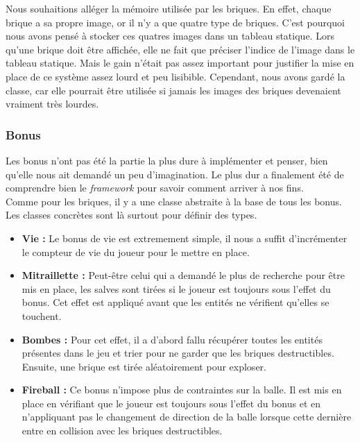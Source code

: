 \documentclass[a4paper,10pt]{article}
\begin{document}
        Nous souhaitions alléger la mémoire utilisée par les briques. En effet, chaque brique a sa propre image, or
        il n'y a que quatre type de briques. C'est pourquoi nous avons pensé à stocker ces quatres images dans un
        tableau statique. Lors qu'une brique doit être affichée, elle ne fait que préciser l'indice de l'image
        dans le tableau statique. Mais le gain n'était pas assez important pour justifier la mise en place de
        ce système assez lourd et peu lisibible. Cependant, nous avons gardé la classe, car elle pourrait être
        utilisée si jamais les images des briques devenaient vraiment très lourdes.

    \subsubsection{Bonus}
        Les bonus n'ont pas été la partie la plus dure à implémenter et penser, bien qu'elle nous ait demandé un peu
        d'imagination. Le plus dur a finalement été de comprendre bien le \textit{framework} pour savoir
        comment arriver à nos fins. \\

        Comme pour les briques, il y a une classe abstraite à la base de tous les bonus. Les classes concrètes
        sont là surtout pour définir des types.

        \begin{itemize}
            \item \textbf{Vie :}
                Le bonus de vie est extremement simple, il nous a suffit d'incrémenter le compteur de vie du joueur
                pour le mettre en place.

            \item \textbf{Mitraillette :}
                Peut-être celui qui a demandé le plus de recherche pour être mis en place, les salves sont tirées
                si le joueur est toujours sous l'effet du bonus. Cet effet est appliqué avant que les entités
                ne vérifient qu'elles se touchent.

            \item \textbf{Bombes :}
                Pour cet effet, il a d'abord fallu récupérer toutes les entités présentes dans le jeu et trier
                pour ne garder que les briques destructibles. Ensuite, une brique est tirée aléatoirement pour exploser.

            \item \textbf{Fireball :}
                Ce bonus n'impose plus de contraintes sur la balle. Il est mis en place en vérifiant que le joueur
                est toujours sous l'effet du bonus et en n'appliquant pas le changement de direction de la balle lorsque
                cette dernière entre en collision avec les briques destructibles.
        \end{itemize}
\end{document}
